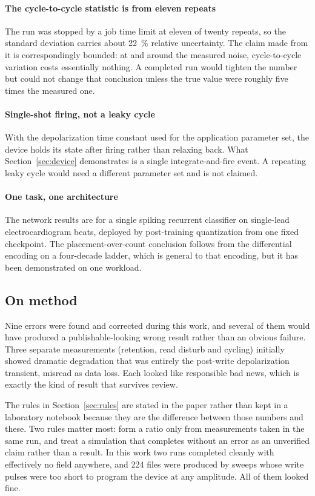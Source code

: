 \paragraph*{The cycle-to-cycle statistic is from eleven repeats} The run was stopped by a
job time limit at eleven of twenty repeats, so the standard deviation carries about
\SI{22}{\percent} relative uncertainty. The claim made from it is correspondingly bounded:
at and around the measured noise, cycle-to-cycle variation costs essentially nothing. A
completed run would tighten the number but could not change that conclusion unless the true
value were roughly five times the measured one.

\paragraph*{Single-shot firing, not a leaky cycle} With the depolarization time constant
used for the application parameter set, the device holds its state after firing rather than
relaxing back. What Section~\ref{sec:device} demonstrates is a single integrate-and-fire
event. A repeating leaky cycle would need a different parameter set and is not claimed.

\paragraph*{One task, one architecture} The network results are for a single spiking
recurrent classifier on single-lead electrocardiogram beats, deployed by post-training
quantization from one fixed checkpoint. The placement-over-count conclusion follows from
the differential encoding on a four-decade ladder, which is general to that encoding, but
it has been demonstrated on one workload.

\subsection{On method}

Nine errors were found and corrected during this work, and several of them would have
produced a publishable-looking wrong result rather than an obvious failure. Three separate
measurements (retention, read disturb and cycling) initially showed dramatic
degradation that was entirely the post-write depolarization transient, misread as data
loss. Each looked like responsible bad news, which is exactly the kind of result that
survives review.

The rules in Section~\ref{sec:rules} are stated in the paper rather than kept in a
laboratory notebook because they are the difference between those numbers and these. Two
rules matter most: form a ratio only from measurements taken in the same run, and treat a
simulation that completes without an error as an unverified claim rather than a result. In
this work two runs completed cleanly with effectively no field anywhere, and 224 files were
produced by sweeps whose write pulses were too short to program the device at any
amplitude. All of them looked fine.
